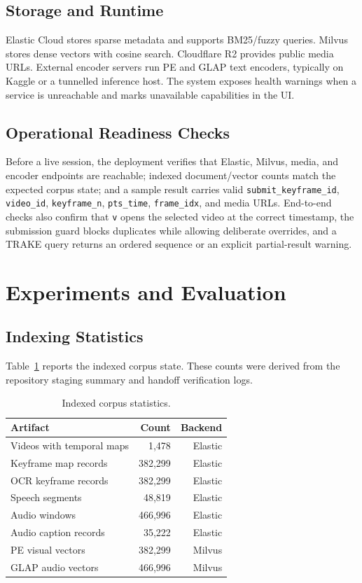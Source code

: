 \documentclass[conference]{IEEEtran}
\newcommand{\sid}{\texttt{submit\_keyframe\_id}}
\newcommand{\vid}{\texttt{video\_id}}
\newcommand{\fid}{\texttt{frame\_idx}}
\newcommand{\kfn}{\texttt{keyframe\_n}}
\newcommand{\ptstime}{\texttt{pts\_time}}
\begin{document}
\subsection{Storage and Runtime}

Elastic Cloud stores sparse metadata and supports BM25/fuzzy queries. Milvus
stores dense vectors with cosine search. Cloudflare R2 provides public media
URLs. External encoder servers run PE and GLAP text encoders, typically on
Kaggle or a tunnelled inference host. The system exposes health warnings when a
service is unreachable and marks unavailable capabilities in the UI.

\subsection{Operational Readiness Checks}

Before a live session, the deployment verifies that Elastic, Milvus, media, and
encoder endpoints are reachable; indexed document/vector counts match the
expected corpus state; and a sample result carries valid \sid{}, \vid{},
\kfn{}, \ptstime{}, \fid{}, and media URLs. End-to-end checks also confirm that
\texttt{v} opens the selected video at the correct timestamp, the submission
guard blocks duplicates while allowing deliberate overrides, and a TRAKE query
returns an ordered sequence or an explicit partial-result warning.

\section{Experiments and Evaluation}

\subsection{Indexing Statistics}

Table~\ref{tab:index-stats} reports the indexed corpus state. These counts were
derived from the repository staging summary and handoff verification logs.

\begin{table}[t]
\centering
\caption{Indexed corpus statistics.}
\label{tab:index-stats}
\begin{tabular}{lrr}
\toprule
Artifact & Count & Backend \\
\midrule
Videos with temporal maps & 1,478 & Elastic \\
Keyframe map records & 382,299 & Elastic \\
OCR keyframe records & 382,299 & Elastic \\
Speech segments & 48,819 & Elastic \\
Audio windows & 466,996 & Elastic \\
Audio caption records & 35,222 & Elastic \\
PE visual vectors & 382,299 & Milvus \\
GLAP audio vectors & 466,996 & Milvus \\
\bottomrule
\end{tabular}
\end{table}
\end{document}
